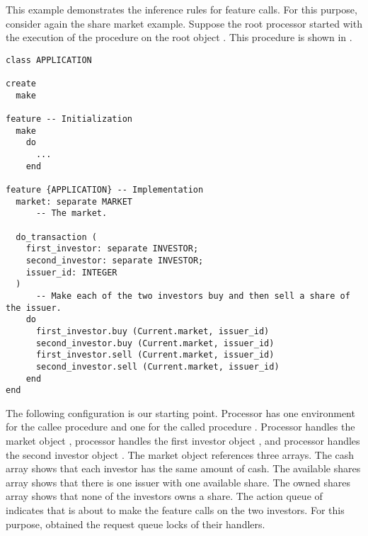 \begin{fortechnicalreport}
\begin{example}
This example demonstrates the inference rules for feature calls. For this purpose, consider again the share market example. Suppose the root processor  started with the execution of the procedure  on the root object . This procedure is shown in .

\begin{lstlisting}[caption=Application class with implementation, label=lst:application class with implementation, language=SCOOP, escapechar=\%]
class APPLICATION

create
  make

feature -- Initialization
  make
    do
      ...
    end

feature {APPLICATION} -- Implementation
  market: separate MARKET
      -- The market.
			
  do_transaction (
    first_investor: separate INVESTOR;
    second_investor: separate INVESTOR;
    issuer_id: INTEGER
  )
      -- Make each of the two investors buy and then sell a share of the issuer.
    do
      first_investor.buy (Current.market, issuer_id)
      second_investor.buy (Current.market, issuer_id)
      first_investor.sell (Current.market, issuer_id)
      second_investor.sell (Current.market, issuer_id)
    end
end
\end{lstlisting}

The following configuration is our starting point. Processor  has one environment for the callee procedure  and one for the called procedure . Processor  handles the market object , processor  handles the first investor object , and processor  handles the second investor object . The market object references three arrays. The cash array  shows that each investor has the same amount of cash. The available shares array  shows that there is one issuer with one available share. The owned shares array  shows that none of the investors owns a share. The action queue of  indicates that  is about to make the feature calls on the two investors. For this purpose,  obtained the request queue locks of their handlers.


\end{example}
\end{fortechnicalreport}
